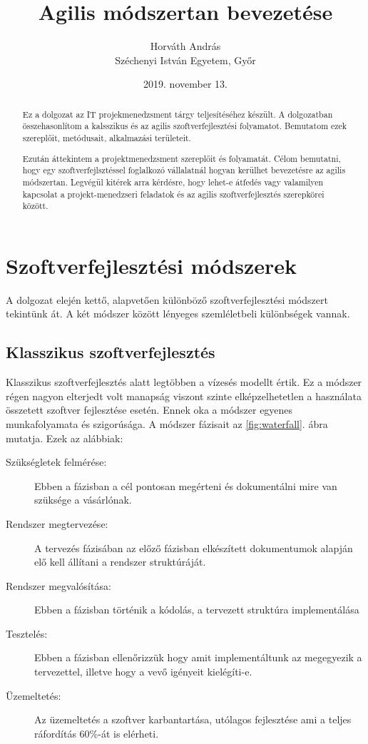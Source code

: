 \documentclass[a4paper,12pt,leqno, notitlepage]{article}%
\newcommand{\figref}[1]{\ref{fig:#1}.}
\begin{document}
\title{Agilis módszertan bevezetése}
\author{Horváth András \\ Széchenyi István Egyetem, Győr}
\date{2019. november 13.}
\maketitle

\begin{abstract}

Ez a dolgozat az IT projekmenedzsment tárgy teljesítéséhez készült. A dolgozatban összehasonlítom a kalsszikus és az agilis szoftver\-fejlesztési folya\-matot. Bemutatom ezek szereplőit, metódusait, alkalmazási területeit.

Ezután áttekintem a projektmenedzsment szereplőit és folyamatát. Célom bemutatni, hogy egy szoftverfejlsztéssel foglalkozó vállalatnál hogyan kerülhet bevezetésre az agilis módszertan. Legvégül kitérek arra kérdésre, hogy lehet-e átfedés vagy valamilyen kapcsolat a projekt-menedzseri feladatok és az agilis szoftver\-fejlesztés szerepkörei között.
\end{abstract}

\section{Szoftver\-fejlesztési módszerek}
\label{sec:s}

A dolgozat elején kettő, alapvetően különböző szoftver\-fejlesztési módszert tekintünk át. A két módszer között lényeges szemléletbeli különbségek vannak.

\subsection{Klasszikus szoftver\-fejlesztés}
\label{sec:Klasszikus}

Klasszikus szoftver\-fejlesztés alatt legtöbben a vízesés modellt értik. Ez a módszer régen nagyon elterjedt volt manapság viszont szinte elképzelhetetlen a használata összetett szoftver fejlesztése esetén. Ennek oka a módszer egyenes munkafolyamata és szigorúsága. A módszer fázisait az \figref{waterfall} ábra~\cite{waterfall_image} mutatja. Ezek az alábbiak:
\begin{description}
	\item[Szükségletek felmérése:] Ebben a fázisban a cél pontosan megérteni és dokumentálni mire van szüksége a vásárlónak.
	\item[Rendszer megtervezése:] A tervezés fázisában az előző fázisban elkészített dokumentumok alapján elő kell állítani a rendszer struktúráját.
	\item[Rendszer megvalósítása:] Ebben a fázisban történik a kódolás, a tervezett struktúra implementálása
	\item[Tesztelés:] Ebben a fázisban ellenőrizzük hogy amit implementáltunk az megegyezik a tervezettel, illetve hogy a vevő igényeit kielégíti-e.
	\item[Üzemeltetés:] Az üzemeltetés a szoftver karbantartása, utólagos fejlesztése ami a teljes ráfordítás 60\%-át is elérheti.\cite{waterfall}
\end{description}
\end{document}
